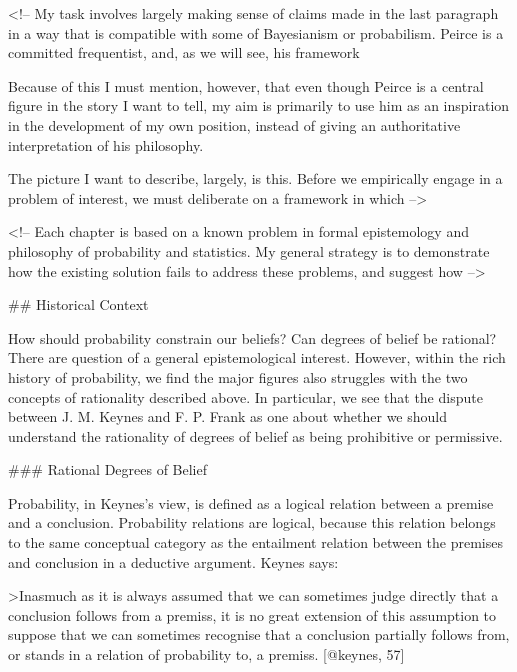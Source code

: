 \textless{}!-- My task involves largely making sense of claims made in
the last paragraph in a way that is compatible with some of Bayesianism
or probabilism. Peirce is a committed frequentist, and, as we will see,
his framework

Because of this I must mention, however, that even though Peirce is a
central figure in the story I want to tell, my aim is primarily to use
him as an inspiration in the development of my own position, instead of
giving an authoritative interpretation of his philosophy.

The picture I want to describe, largely, is this. Before we empirically
engage in a problem of interest, we must deliberate on a framework in
which --\textgreater{}

\textless{}!-- Each chapter is based on a known problem in formal
epistemology and philosophy of probability and statistics. My general
strategy is to demonstrate how the existing solution fails to address
these problems, and suggest how --\textgreater{}

\#\# Historical Context

How should probability constrain our beliefs? Can degrees of belief be
rational? There are question of a general epistemological interest.
However, within the rich history of probability, we find the major
figures also struggles with the two concepts of rationality described
above. In particular, we see that the dispute between J. M. Keynes and
F. P. Frank as one about whether we should understand the rationality of
degrees of belief as being prohibitive or permissive.

\#\#\# Rational Degrees of Belief

Probability, in Keynes's view, is defined as a logical relation between
a premise and a conclusion. Probability relations are logical, because
this relation belongs to the same conceptual category as the entailment
relation between the premises and conclusion in a deductive argument.
Keynes says:

\textgreater{}Inasmuch as it is always assumed that we can sometimes
judge directly that a conclusion follows from a premiss, it is no great
extension of this assumption to suppose that we can sometimes recognise
that a conclusion partially follows from, or stands in a relation of
probability to, a premiss. {[}@keynes, 57{]}

